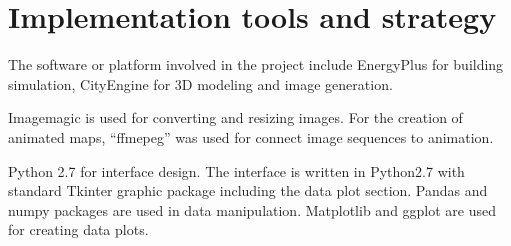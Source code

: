 \section {Implementation tools and strategy}
The software or platform involved in the project include EnergyPlus
for building simulation, CityEngine for 3D modeling and image
generation. 

Imagemagic is used for converting and resizing images. For the
creation of animated maps, ``ffmepeg'' was used for connect image
sequences to animation.

Python 2.7 for interface design. The interface is written
in Python2.7 with standard Tkinter graphic package including the data
plot section. Pandas and numpy packages are used in data
manipulation. Matplotlib and ggplot are used for creating data plots.

\begin{comment}
\section{Future Trends}
Harrower and Fabrikant mentioned that the chanllenge of using animated
maps is the overflow of information and the vulnerability to
distraction~\cite{Harrower2008}. One example mentioned by Harrower and
Fabrikant is the comparison of color on the map and that on the legend
becomes difficult for animated maps as a result of the changing of
images. They proposed the audio legend approach of strengthening
information convey with minimized
distraction~\cite{Harrower2008}. This might become one of the next
extensions of the current Dynamic Energy Map interface design.

They also suggested that the difference in time should have different
visual representations in data display~\cite{Harrower2008}. Peuquet
claimed that ``The development of temporal analytical capabilities in
GIS such as temporal queries requires basic topological structures in
both time and space''~\cite{Peuquet1994}. Thus the different spatial
representation seems to be a natural choice for adapting to different
temporal resolution and scale.



The non-interactive animation could be found
\href{http://www.armechxyj.com/energy-mapping.html#redblueAnime3d}{through
  this link}.
\end{comment}